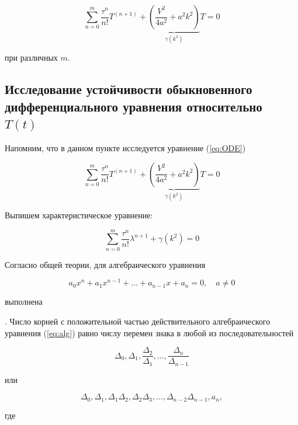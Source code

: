 \begin{equation}\label{eq:ODE}
\sum\limits_{n=0}^{m} \dfrac{\tau^n}{n!} T^{(n+1)} + \underbrace{ \left( \dfrac{V^2}{4a^2} + a^2 k^2 \right)}_{\gamma(k^2)} T = 0
\end{equation}

при различных $m$.

\subsection{Исследование устойчивости обыкновенного\\дифференциального уравнения относительно $T(t)$}

Напомним, что в данном пункте исследуется уравнение (\ref{eq:ODE})

\begin{equation*}
\sum\limits_{n=0}^{m} \dfrac{\tau^n}{n!} T^{(n+1)} + \underbrace{ \left( \dfrac{V^2}{4a^2} + a^2 k^2 \right)}_{\gamma(k^2)} T = 0
\end{equation*}

Выпишем характеристическое уравнение:

\begin{equation*}
\sum\limits_{n=0}^{m} \dfrac{\tau^n}{n!} \lambda^{n+1} + {\gamma(k^2)} = 0
\end{equation*}

Согласно общей теории, для алгебраического уравнения

\begin{equation}\label{eq:alg}
a_0 x^n + a_1 x^{n-1} + \dots + a_{n-1} x + a_n = 0, \quad a \neq 0
\end{equation}

выполнена

. Число корней с положительной частью действительного алгебраического уравнения (\ref{eq:alg}) равно числу перемен знака в любой из последовательностей

\begin{equation}
\Delta_0, \Delta_1, \dfrac{\Delta_2}{\Delta_1}, \dots, \dfrac{\Delta_n}{\Delta_{n-1}}
\end{equation}

или

\begin{equation}
\Delta_0, \Delta_1, \Delta_1 \Delta_2, \Delta_2 \Delta_3, \dots, \Delta_{n-2} \Delta_{n-1}, a_n,
\end{equation}

где

